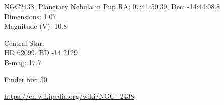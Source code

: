 \begin{block}{NGC2438, Planetary Nebula in Pup}
    RA: 07:41:50.39, Dec: -14:44:08.8 \\ 
    Dimensions: 1.07 \\ 
    Magnitude (V): 10.8

    Central Star: \\ 
      \hspace{1em}HD 62099, BD -14 2129 \\ 
      \hspace{1em}B-mag: 17.7 


    Finder fov: 30 

    \url{https://en.wikipedia.org/wiki/NGC_2438} 
\end{block}